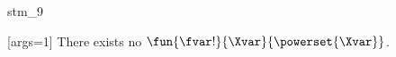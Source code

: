 \documentclass{stex}
\begin{document}
\begin{smodule}{stm_9}
  
  \begin{sassertion}[id=stm-9]
    [args=1]{}
    There exists no  
    $\fun{\fvar!}{\Xvar}{\powerset{\Xvar}}$.
  \end{sassertion}
\end{smodule}
\end{document}
